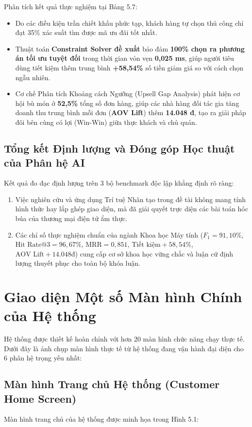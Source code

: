 \documentclass{uetgraduation}
\begin{document}
Phân tích kết quả thực nghiệm tại Bảng 5.7:
\begin{itemize}
    \item Do các điều kiện trần chiết khấu phức tạp, khách hàng tự chọn thủ công chỉ đạt 35\% xác suất tìm được mã ưu đãi tốt nhất.
    \item Thuật toán \textbf{Constraint Solver đề xuất} bảo đảm \textbf{100\% chọn ra phương án tối ưu tuyệt đối} trong thời gian vỏn vẹn \textbf{0,025 ms}, giúp người tiêu dùng tiết kiệm thêm trung bình \textbf{+58,54\%} số tiền giảm giá so với cách chọn ngẫu nhiên.
    \item Cơ chế Phân tích Khoảng cách Ngưỡng (Upsell Gap Analysis) phát hiện cơ hội bù món ở \textbf{52,5\%} tổng số đơn hàng, giúp các nhà hàng đối tác gia tăng doanh thu trung bình mỗi đơn (\textbf{AOV Lift}) thêm \textbf{14.048 đ}, tạo ra giải pháp đôi bên cùng có lợi (Win-Win) giữa thực khách và chủ quán.
\end{itemize}

\clearpage
\subsection{Tổng kết Định lượng và Đóng góp Học thuật của Phân hệ AI}
Kết quả đo đạc định lượng trên 3 bộ benchmark độc lập khẳng định rõ ràng:
\begin{enumerate}
    \item Việc nghiên cứu và ứng dụng Trí tuệ Nhân tạo trong đề tài không mang tính hình thức hay lắp ghép giao diện, mà đã giải quyết trực diện các bài toán hóc búa của thương mại điện tử ẩm thực.
    \item Các chỉ số thực nghiệm chuẩn của ngành Khoa học Máy tính ($F_1 = 91,10\%$, $\text{Hit Rate@3} = 96,67\%$, $\text{MRR} = 0,851$, $\text{Tiết kiệm} +58,54\%$, $\text{AOV Lift} +14.048$đ) cung cấp cơ sở khoa học vững chắc và luận cứ định lượng thuyết phục cho toàn bộ khóa luận.
\end{enumerate}

\section{Giao diện Một số Màn hình Chính của Hệ thống}
Hệ thống được thiết kế hoàn chỉnh với hơn 20 màn hình chức năng chạy thực tế. Dưới đây là ảnh chụp màn hình thực tế từ hệ thống đang vận hành đại diện cho 6 phân hệ trọng yếu nhất:

\clearpage
\subsection{Màn hình Trang chủ Hệ thống (Customer Home Screen)}
Màn hình trang chủ của hệ thống được minh họa trong Hình 5.1:
\end{document}
